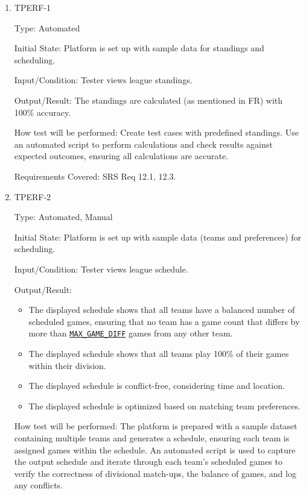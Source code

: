 \documentclass[12pt, titlepage]{article}
\begin{document}
\begin{enumerate}

    \item{TPERF-1\\}

          Type: Automated

          Initial State: Platform is set up with sample data for standings and scheduling.

          Input/Condition: Tester views league standings.

          Output/Result: The standings are calculated (as mentioned in FR) with 100\% accuracy.

          How test will be performed: Create test cases with predefined standings. Use an automated script to perform calculations and check results against expected outcomes, ensuring all calculations are accurate.

          Requirements Covered: SRS Req 12.1, 12.3.

    \item{TPERF-2\\}

          Type: Automated, Manual

          Initial State: Platform is set up with sample data (teams and preferences) for scheduling.

          Input/Condition: Tester views league schedule.

          Output/Result:
          \begin{itemize}
              \item{The displayed schedule shows that all teams have a balanced number of scheduled games, ensuring that no team has a game count that differs by more than \hyperref[MAX_GAME_DIFF]{\texttt{MAX\_GAME\_DIFF}} games from any other team.}
              \item{The displayed schedule shows that all teams play 100\% of their games within their division.}
              \item{The displayed schedule is conflict-free, considering time and location.}
              \item{The displayed schedule is optimized based on matching team preferences.}
          \end{itemize}

          How test will be performed:  The platform is prepared with a sample dataset containing multiple teams and generates a schedule, ensuring each team is assigned games within the schedule. An automated script is used to capture the output schedule and iterate through each team's scheduled games to verify the correctness of divisional match-ups, the balance of games, and log any conflicts.


\end{enumerate}
\end{document}
